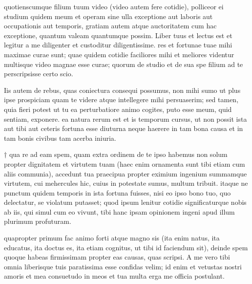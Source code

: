 


 quotienscumque filium tuum video (video autem fere cotidie), polliceor ei studium quidem meum et operam sine ulla exceptione aut laboris aut occupationis aut temporis, gratiam autem atque auctoritatem cum hac exceptione, quantum valeam quantumque possim. Liber tuus et lectus est et legitur a me diligenter et custoditur diligentissime. res et fortunae tuae mihi maximae curae sunt; quae quidem cotidie faciliores mihi et meliores videntur multisque video magnae esse curae; quorum de studio et de sua spe filium ad te perscripsisse certo scio.

 Iis autem de rebus, quas coniectura consequi possumus, non mihi sumo ut plus ipse prospiciam quam te videre atque intellegere mihi persuaserim; sed tamen, quia fieri potest ut tu ea perturbatiore animo cogites, puto esse meum, quid sentiam, exponere. ea natura rerum est et is temporum cursus, ut non possit ista aut tibi aut ceteris fortuna esse diuturna neque haerere in tam bona causa et in tam bonis civibus tam acerba iniuria.

 † qua re ad eam spem, quam extra ordinem de te ipso habemus non solum propter dignitatem et virtutem tuam (haec enim ornamenta sunt tibi etiam cum aliis communia), accedunt tua praecipua propter eximium ingenium summamque virtutem, cui mehercules hic, cuius in potestate sumus, multum tribuit. itaque ne punctum quidem temporis in ista fortuna fuisses, nisi eo ipso bono tuo, quo delectatur, se violatum putasset; quod ipsum lenitur cotidie significaturque nobis ab iis, qui simul cum eo vivunt, tibi hanc ipsam opinionem ingeni apud illum plurimum profuturam.

 quapropter primum fac animo forti atque magno sis (ita enim natus, ita educatus, ita doctus es, ita etiam cognitus, ut tibi id faciendum sit), deinde spem quoque habeas firmissimam propter eas causas, quas scripsi. A me vero tibi omnia liberisque tuis paratissima esse confidas velim; id enim et vetustas nostri amoris et mea consuetudo in meos et tua multa erga me officia postulant.
